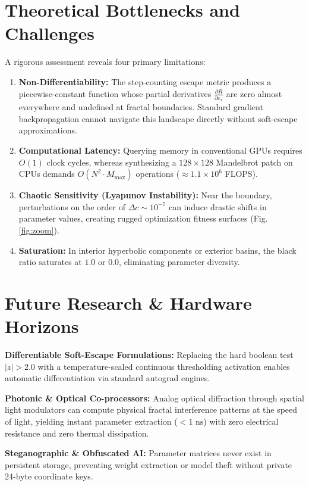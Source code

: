 \documentclass[10pt,journal,compsoc,twocolumn]{article}
\begin{document}
\section{Theoretical Bottlenecks and Challenges}
A rigorous assessment reveals four primary limitations:
\begin{enumerate}
    \item \textbf{Non-Differentiability:} The step-counting escape metric produces a piecewise-constant function whose partial derivatives $\frac{\partial R}{\partial c_x}$ are zero almost everywhere and undefined at fractal boundaries. Standard gradient backpropagation cannot navigate this landscape directly without soft-escape approximations.
    \item \textbf{Computational Latency:} Querying memory in conventional GPUs requires $O(1)$ clock cycles, whereas synthesizing a $128 \times 128$ Mandelbrot patch on CPUs demands $O(N^2 \cdot M_{\text{max}})$ operations ($\approx 1.1 \times 10^6$ FLOPS).
    \item \textbf{Chaotic Sensitivity (Lyapunov Instability):} Near the boundary, perturbations on the order of $\Delta c \sim 10^{-7}$ can induce drastic shifts in parameter values, creating rugged optimization fitness surfaces (Fig. \ref{fig:zoom}).
    \item \textbf{Saturation:} In interior hyperbolic components or exterior basins, the black ratio saturates at $1.0$ or $0.0$, eliminating parameter diversity.
\end{enumerate}

\section{Future Research & Hardware Horizons}
\textbf{Differentiable Soft-Escape Formulations:} Replacing the hard boolean test $|z| > 2.0$ with a temperature-scaled continuous thresholding activation enables automatic differentiation via standard autograd engines.

\textbf{Photonic & Optical Co-processors:} Analog optical diffraction through spatial light modulators can compute physical fractal interference patterns at the speed of light, yielding instant parameter extraction ($< 1\text{ ns}$) with zero electrical resistance and zero thermal dissipation.

\textbf{Steganographic & Obfuscated AI:} Parameter matrices never exist in persistent storage, preventing weight extraction or model theft without private 24-byte coordinate keys.
\end{document}
